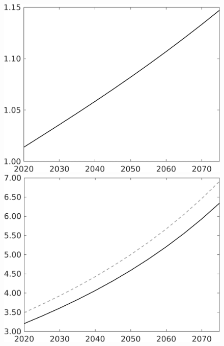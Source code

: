 \documentclass[12pt]{article}
\begin{document}
\begin{figure}[h!!]
\begin{minipage}[]{0.32\textwidth}
	\end{minipage}	
	\begin{minipage}[]{0.32\textwidth}
		\includegraphics[width=1\textwidth]{../../codding_model/own_basedOnFried/optimalPol_010922_revision/figures/all_13Sept22/CompTaul_Equlab_LFBAU_Reg0_lambdaa_spillover0_nsk1_xgr1_knspil0_sep1_countec0_GovRev0_etaa0.79_lgd0.png}
	\end{minipage}	
	\begin{minipage}[]{0.32\textwidth}
		\includegraphics[width=1\textwidth]{../../codding_model/own_basedOnFried/optimalPol_010922_revision/figures/all_13Sept22/CompTaul_Equlab_LFBAU_Reg0_Y_spillover0_nsk1_xgr1_knspil0_sep1_countec0_GovRev0_etaa0.79_lgd0.png}

\end{minipage}
\end{figure}
\end{document}
